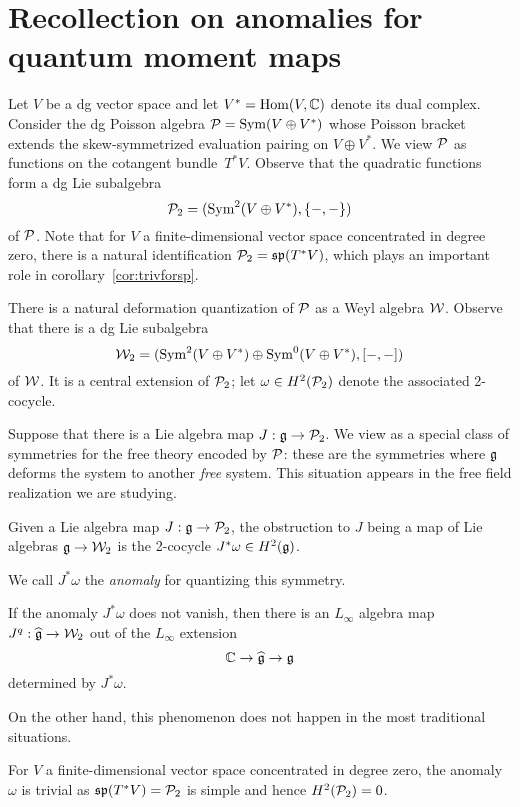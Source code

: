 \documentclass[11pt]{amsart}
\begin{document}
\section{Recollection on anomalies for quantum moment maps}

Let $V$ be a dg vector space and let $V^* = {\rm Hom}(V, \mathbb C)$ denote its dual complex. 
Consider the dg Poisson algebra $\mathcal P = \operatorname{Sym}(V \oplus V^*)$ whose Poisson bracket extends the skew-symmetrized evaluation pairing on $V \oplus V^*$.
We view $\mathcal P$ as functions on the cotangent bundle~$T^* V$.
Observe that the quadratic functions form a dg Lie subalgebra
\[
\mathcal P_2 = (\operatorname{Sym}^2(V \oplus V^*), \{-,-\})
\]
of $\mathcal P$.
Note that for $V$ a finite-dimensional vector space concentrated in degree zero,
there is a natural identification $\mathcal P_2 = \frak{sp}(T^*V)$, which plays an important role in corollary~\ref{cor:trivforsp}.

There is a natural deformation quantization of $\mathcal P$ as a Weyl algebra $\mathcal W$.
Observe that there is a dg Lie subalgebra
\[
\mathcal W_2 = (\operatorname{Sym}^2(V \oplus V^*) \oplus \operatorname{Sym}^0(V \oplus V^*), [-,-])
\]
of $\mathcal W$.
It is a central extension of $\mathcal P_2$; let $\omega \in H^2(\mathcal P_2)$ denote the associated 2-cocycle.

Suppose that there is a Lie algebra map $J: \mathfrak g \to \mathcal P_2$.
We view as a special class of symmetries for the free theory encoded by $\mathcal P$:
these are the symmetries where $\mathfrak g$ deforms the system to another {\em free} system.
This situation appears in the free field realization we are studying.

\begin{lem}
Given a Lie algebra map $J: \mathfrak g \to \mathcal P_2$, the obstruction to $J$ being a map of Lie algebras $\mathfrak g \to \mathcal W_2$ is the 2-cocycle $J^* \omega \in H^2(\mathfrak g)$.
\end{lem}

We call $J^*\omega$ the {\em anomaly} for quantizing this symmetry.

\begin{cor}
If the anomaly $J^*\omega$ does not vanish, then there is an $L_\infty$ algebra map $J^q: \widehat{\mathfrak g} \to \mathcal W_2$ out of the $L_\infty$ extension
\[
\mathbb C \to \widehat{\mathfrak g} \to \mathfrak g
\]
determined by $J^* \omega$.
\end{cor}

On the other hand, this phenomenon does not happen in the most traditional situations.

\begin{cor}
\label{cor:trivforsp}
For $V$ a finite-dimensional vector space concentrated in degree zero, the anomaly $\omega$ is trivial as $\frak{sp}(T^* V) = \mathcal P_2$ is simple and hence $H^2(\mathcal P_2) = 0$.
\end{cor}
\end{document}
